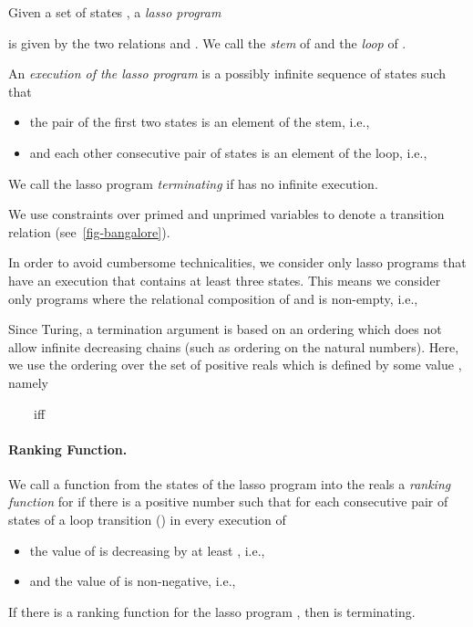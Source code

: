 \documentclass[a4paper]{llncs}
\newcommand{\defo}[1]{\emph{#1}}
\begin{document}
\begin{definition} Given a set of states , a \defo{lasso program} 

is given by the two relations  and .
We call  the \defo{stem} of  and  the \defo{loop} of .

An \defo{execution of the lasso program}  is a possibly infinite sequence of states  such that
\begin{itemize}
 \item the pair of the first two states is an element of the stem, i.e.,
 
 \item and each other consecutive pair of states is an element of the loop, i.e.,
 
\end{itemize}
We call the lasso program  \defo{terminating} if  has no infinite execution.

\end{definition}
We use constraints over primed and unprimed variables to denote a transition relation (see~\autoref{fig-bangalore}).


In order to avoid cumbersome technicalities, we consider only lasso programs that have an execution that contains at least three states. This means we consider only programs where the relational composition of  and  is non-empty, i.e.,




Since Turing, a termination argument is based on an ordering which does not allow infinite decreasing chains (such as ordering on the natural numbers).  Here, we use the ordering over the set of positive reals which is defined by some value , namely

\begin{center}
\hfil\hfil\hfil  \ \ \ \  iff \ \ \ \   \hfil\hfil\hfil  
\end{center}

\paragraph{Ranking Function.}
We call a function  from the states of the lasso program  into
the reals  a \defo{ranking function} for  if there is a
positive number  such that for each consecutive pair of
states  of a loop transition ()
in every execution of 
\begin{itemize}
\item the value of  is decreasing by at least , i.e.,

\item and the value of  is non-negative, i.e.,

\end{itemize}
If there is a ranking function for the lasso program , then  is terminating.
\end{document}
